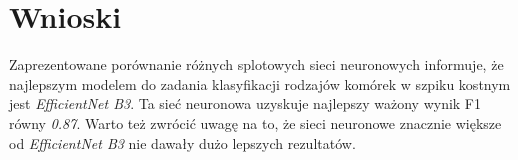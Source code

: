 \section{Wnioski}

Zaprezentowane porównanie różnych splotowych sieci neuronowych informuje, że najlepszym modelem do zadania klasyfikacji rodzajów komórek w szpiku kostnym jest \textit{EfficientNet B3}.
Ta sieć neuronowa uzyskuje najlepszy ważony wynik F1 równy \textit{0.87}.
Warto też zwrócić uwagę na to, że sieci neuronowe znacznie większe od \textit{EfficientNet B3} nie dawały dużo lepszych rezultatów.

